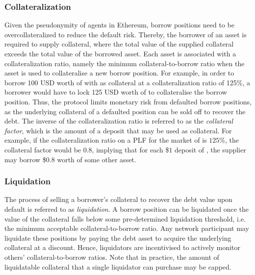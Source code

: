 \subsubsection{Collateralization}
Given the pseudonymity of agents in Ethereum, borrow positions need to be overcollateralized to reduce the default risk.
Thereby, the borrower of an asset is required to supply collateral, where the total value of the supplied collateral exceeds the total value of the borrowed asset.
Each asset is associated with a collateralization ratio, namely the minimum collateral-to-borrow ratio when the asset is used to collateralise a new borrow position.
For example, in order to borrow 100 USD worth of  with  as collateral at a collateralization ratio of 125\%, a borrower would have to lock 125 USD worth of  to collateralise the borrow position.
Thus, the protocol limits monetary risk from defaulted borrow positions, as the underlying collateral of a defaulted position can be sold off to recover the debt.
The inverse of the collateralization ratio is referred to as the \textit{collateral factor}, which is the amount of a deposit that may be used as collateral.
For example, if the collateralization ratio on a PLF for the market of  is $125$\%, the collateral factor would be $0.8$, implying that for each \$$1$ deposit of , the supplier may borrow \$$0.8$ worth of some other asset.

\subsubsection{Liquidation}
The process of selling a borrower's collateral to recover the debt value upon default is referred to as \textit{liquidation}.
A borrow position can be liquidated once the value of the collateral falls below some pre-determined liquidation threshold, i.e. the minimum acceptable collateral-to-borrow ratio.
Any network participant may liquidate these positions by paying the debt asset to acquire the underlying collateral at a discount.
Hence, liquidators are incentivised to actively monitor others' collateral-to-borrow ratios. 
Note that in practice, the amount of liquidatable collateral that a single liquidator can purchase may be capped.  

